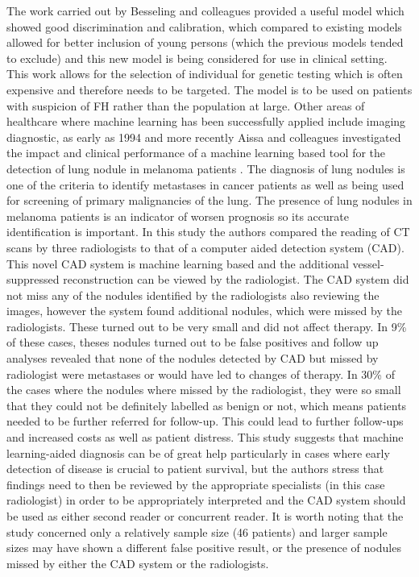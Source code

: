  The work carried out by Besseling and colleagues provided a useful model which showed good discrimination and calibration, which compared to existing models allowed for better inclusion of young persons (which the previous models tended to exclude) and this new model is being considered for use in clinical setting. This work allows for the selection of individual for genetic testing which is often expensive and therefore needs to be targeted. The model is to be used on patients with suspicion of FH rather than the population at large.\newline
 Other areas of healthcare where machine learning has been successfully applied include imaging diagnostic, as early as 1994 \citep{OLMangasarian:1994ue} and more recently Aissa and colleagues investigated the impact and clinical performance of a machine learning based tool for the detection of lung nodule in melanoma patients \citep{Aissa:2018jm}.\newline
 The diagnosis of lung nodules is one of the criteria to identify metastases in cancer patients as well as being used for screening of primary malignancies of the lung. The presence of lung nodules in melanoma patients is an indicator of worsen prognosis so its accurate identification is important. In this study the authors compared the reading of CT scans by three radiologists to that of a computer aided detection system (CAD). This novel CAD system is machine learning based and the additional vessel-suppressed reconstruction can be viewed by the radiologist.\newline
 The CAD system did not miss any of the nodules identified by the radiologists also reviewing the images, however the system found additional nodules, which were missed by the radiologists. These turned out to be very small and did not affect therapy. In 9\% of these cases, theses nodules turned out to be false positives and follow up analyses revealed that none of the nodules detected by CAD but missed by radiologist were metastases or would have led to changes of therapy. In 30\% of the cases where the nodules where missed by the radiologist, they were so small that they could not be definitely labelled as benign or not, which means patients needed to be further referred for follow-up. This could lead to further follow-ups and increased costs as well as patient distress. This study suggests that machine learning-aided diagnosis can be of great help particularly in cases where early detection of disease is crucial to patient survival, but the authors stress that findings need to then be reviewed by the appropriate specialists (in this case radiologist) in order to be appropriately interpreted and the CAD system should be used as either second reader or concurrent reader. It is worth noting that the study concerned only a relatively sample size (46 patients) and larger sample sizes may have shown a different false positive result, or the presence of nodules missed by either the CAD system or the radiologists.\newline
